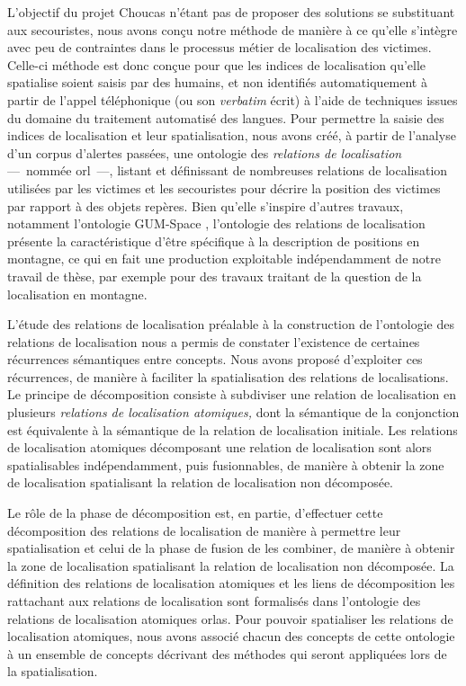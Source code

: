 L'objectif du projet Choucas n'étant pas de proposer des solutions se
substituant aux secouristes, nous avons conçu notre méthode de manière
à ce qu'elle s'intègre avec peu de contraintes dans le processus
métier de localisation des victimes. Celle-ci méthode est donc conçue
pour que les indices de localisation qu'elle spatialise soient saisis
par des humains, et non identifiés automatiquement à partir de l'appel
téléphonique (ou son \emph{verbatim} écrit) à l'aide de techniques
issues du domaine du traitement automatisé des langues. Pour permettre
la saisie des indices de localisation et leur spatialisation, nous
avons créé, à partir de l'analyse d'un corpus d'alertes passées, une
ontologie des \emph{relations de localisation} ---~nommée
\ac{orl}~---, listant et définissant de nombreuses relations de
localisation utilisées par les victimes et les secouristes pour
décrire la position des victimes par rapport à des objets
repères. Bien qu'elle s'inspire d'autres travaux, notamment
l'ontologie GUM-Space \autocite{Bateman2010}, l'ontologie des
relations de localisation présente la caractéristique d'être
spécifique à la description de positions en montagne, ce qui en fait
une production exploitable indépendamment de notre travail de thèse,
par exemple pour des travaux traitant de la question de la
localisation en montagne.

L'étude des relations de localisation préalable à la construction de
l'ontologie des relations de localisation nous a permis de constater
l’existence de certaines récurrences sémantiques entre concepts. Nous
avons proposé d'exploiter ces récurrences, de manière à faciliter la
spatialisation des relations de localisations. Le principe de
décomposition consiste à subdiviser une relation de localisation en
plusieurs \emph{relations de localisation atomiques,} dont la
sémantique de la conjonction est équivalente à la sémantique de la
relation de localisation initiale. Les relations de localisation
atomiques décomposant une relation de localisation sont alors
spatialisables indépendamment, puis fusionnables, de manière à obtenir
la zone de localisation spatialisant la relation de localisation non
décomposée.

Le rôle de la phase de décomposition est, en partie, d'effectuer cette
décomposition des relations de localisation de manière à permettre
leur spatialisation et celui de la phase de fusion de les combiner, de
manière à obtenir la zone de localisation spatialisant la relation de
localisation non décomposée. La définition des relations de
localisation atomiques et les liens de décomposition les rattachant
aux relations de localisation sont formalisés dans l'ontologie des
relations de localisation atomiques \acp{orla}. Pour pouvoir
spatialiser les relations de localisation atomiques, nous avons
associé chacun des concepts de cette ontologie à un ensemble de
concepts décrivant des méthodes qui seront appliquées lors de la
spatialisation.

